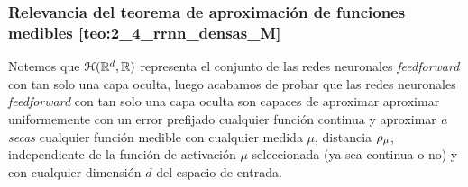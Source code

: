 \subsubsection{Relevancia del teorema de aproximación de funciones medibles \ref{teo:2_4_rrnn_densas_M}}

Notemos que  $\mathcal{H}(\mathbb{R}^d,\mathbb{R})$ representa el conjunto de 
las redes neuronales \textit{feedforward} con tan solo una capa oculta, luego 
acabamos de probar que las redes neuronales \textit{feedforward} con 
tan solo una capa oculta son capaces de aproximar 
aproximar uniformemente con un error prefijado
cualquier función continua y aproximar \textit{a secas} cualquier
función medible 
con cualquier medida $\mu$, distancia $\rho_{\mu}$, independiente de la 
función de activación $\mu$ seleccionada (ya sea continua o no) 
y con cualquier dimensión $d$ del espacio de entrada. 

 
